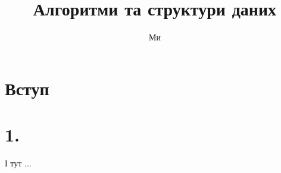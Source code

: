 \documentclass[12pt]{article}
\author{Ми}
\title{\textbf{Алгоритми та структури даних}}
\theoremstyle{definition}
\begin{document}
\maketitle
\section*{Вступ}
\section{1.}
І тут ...

\newpage
{}
\begin{thebibliography}{100}

\end{thebibliography}
\end{document}
